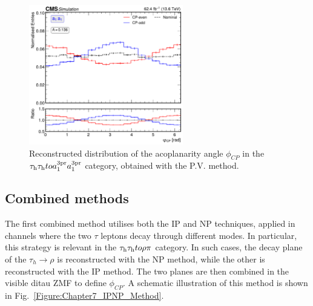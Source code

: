 \begin{figure}[!htbp]
    \centering
    \includegraphics[width=0.6\textwidth]{Figures/Chapter7/Acoplanarity/With_IP/aco_a1_a1.pdf}
    \caption[Reconstructed $\phi_{CP}$ distribution in the $\tauh\tauh\to a_1^\text{3pr}a_1^\text{3pr}$ category using the \ac{P.V.} method.]
    {Reconstructed distribution of the acoplanarity angle $\phi_{CP}$ in the $\tauh\tauh \to a_1^\text{3pr}a_1^\text{3pr}$ category, obtained with the \ac{P.V.} method.}
    \label{Figure:CPDist_PVMethod}
\end{figure}

\subsection{Combined methods}
\label{Section:Chapter7_CombinedMethods}

The first combined method utilises both the \ac{IP} and \ac{NP} techniques, applied in channels where the two $\tau$ leptons decay through different modes. In particular, this strategy is relevant in the $\tau_\mathrm{h}\tau_\mathrm{h} to \rho\pi$ category. In such cases, the decay plane of the $\tau_h\to\rho$ is reconstructed with the \ac{NP} method, while the other is reconstructed with the \ac{IP} method. The two planes are then combined in the visible ditau \ac{ZMF} to define $\phi_{CP}$. A schematic illustration of this method is shown in Fig.~\ref{Figure:Chapter7_IPNP_Method}.

